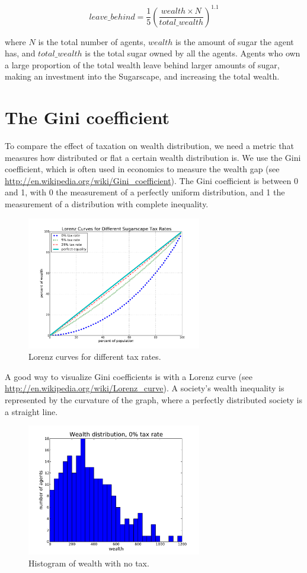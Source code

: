 \documentclass[10pt]{book}
\begin{document}
\[ leave\_behind = \frac{1}{5} 
           \left( \frac{wealth\times N}{total\_wealth} \right)^{1.1} \]

where $N$ is the total number of agents, $wealth$ is the amount of sugar
the agent has, and $total\_wealth$ is the total sugar
owned by all the agents.  Agents who own a large proportion of the
total wealth leave behind larger amounts of sugar, making an
investment into the Sugarscape, and increasing the total wealth.

\section{The Gini coefficient}

To compare the effect of taxation on wealth distribution, we need a
metric that measures how distributed or flat a certain wealth
distribution is.  We use the Gini coefficient, which is often used in
economics to measure the wealth gap (see \url{http://en.wikipedia.org/wiki/Gini_coefficient}). The Gini coefficient
is between 0 and 1, with 0 the measurement of a perfectly uniform
distribution, and 1 the measurement of a distribution with complete
inequality.

\begin{figure}[ht]
\centerline{\includegraphics[width=3.0in]{figs/lorenz.pdf}}
\caption{Lorenz curves for different tax rates.\label{fig.lorenz}}
\end{figure}

A good way to visualize Gini coefficients is with a Lorenz curve (see
\url{http://en.wikipedia.org/wiki/Lorenz_curve}).  A society's wealth inequality is represented by the
curvature of the graph, where a perfectly distributed society is a
straight line.

\begin{figure}[ht]
\centerline{\includegraphics[width=3.0in]{figs/pmf_notax.pdf}}
\caption{Histogram of wealth with no tax.\label{fig.notax}}
\end{figure}
\end{document}
